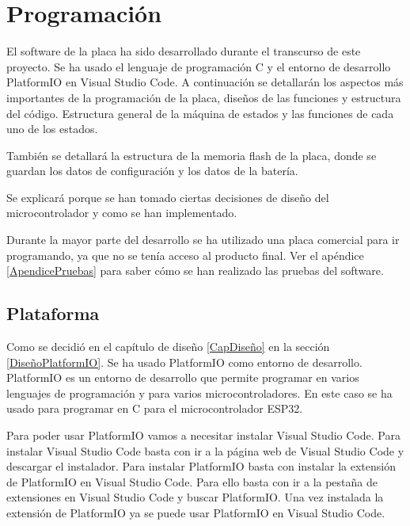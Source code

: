 \chapter{Programación}

El software de la placa ha sido desarrollado durante el transcurso de este proyecto. Se ha usado el lenguaje de programación C y el entorno de desarrollo \gls{PlatformIO} en Visual Studio Code. A continuación se detallarán los aspectos más importantes de la programación de la placa, diseños de las funciones y estructura del código. Estructura general de la máquina de estados y las funciones de cada uno de los estados.

También se detallará la estructura de la memoria flash de la placa, donde se guardan los datos de configuración y los datos de la batería.

Se explicará porque se han tomado ciertas decisiones de diseño del microcontrolador y como se han implementado.

\begin{tcolorbox}[colback=blue!5!white, colframe=blue!55!white, title=Nota]
    Durante la mayor parte del desarrollo se ha utilizado una placa comercial para ir programando, ya que no se tenía acceso al producto final. Ver el apéndice \ref{ApendicePruebas} para saber cómo se han realizado las pruebas del software.  
\end{tcolorbox}

\section{Plataforma}
Como se decidió en el capítulo de diseño \ref{CapDiseño} en la sección \ref{DiseñoPlatformIO}. Se ha usado \gls{PlatformIO} como entorno de desarrollo. \gls{PlatformIO} es un entorno de desarrollo que permite programar en varios lenguajes de programación y para varios microcontroladores. En este caso se ha usado para programar en C para el microcontrolador ESP32.

Para poder usar \gls{PlatformIO} vamos a necesitar instalar Visual Studio Code. Para instalar Visual Studio Code basta con ir a la página web de Visual Studio Code y descargar el instalador. Para instalar \gls{PlatformIO} basta con instalar la extensión de \gls{PlatformIO} en Visual Studio Code. Para ello basta con ir a la pestaña de extensiones en Visual Studio Code y buscar \gls{PlatformIO}. Una vez instalada la extensión de \gls{PlatformIO} ya se puede usar \gls{PlatformIO} en Visual Studio Code.

